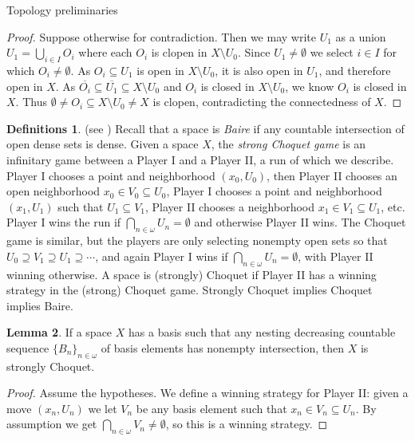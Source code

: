 \documentclass{amsart}
\theoremstyle{definition}\newtheorem{theorem}{Theorem}
\theoremstyle{definition}\newtheorem{bigtheorem}{Theorem}
\numberwithin{theorem}{section}
\theoremstyle{definition}\newtheorem{corollary}[theorem]{Corollary}
\theoremstyle{definition}\newtheorem{proposition}[theorem]{Proposition}
\theoremstyle{definition}\newtheorem{definition}[theorem]{Definition}
\theoremstyle{definition}\newtheorem{question}[theorem]{Question}
\theoremstyle{definition}\newtheorem{example}[theorem]{Example}
\theoremstyle{definition}\newtheorem{remark}[theorem]{Remark}
\theoremstyle{definition}\newtheorem{note}[theorem]{Note}
\theoremstyle{definition}\newtheorem{lemma}[theorem]{Lemma}
\theoremstyle{definition}\newtheorem{fact}[theorem]{Fact}
\theoremstyle{definition}\newtheorem{define}[theorem]{Definition}
\theoremstyle{definition}\newtheorem{definitions}[theorem]{Definitions}
\theoremstyle{definition}\newtheorem{claim}[theorem]{Claim}
\theoremstyle{definition}\newtheorem{obs}[theorem]{Observation}
\theoremstyle{definition}\newtheorem{construction}[theorem]{Construction}
\begin{document}
\begin{section}{Topology preliminaries}
\begin{proof}  Suppose otherwise for contradiction.  Then we may write $U_1$ as a union $U_1 = \bigcup_{i\in I}O_i$ where each $O_i$ is clopen in $X \setminus U_0$.  Since $U_1 \neq \emptyset$ we select $i \in I$ for which $O_i \neq \emptyset$.  As $O_i \subseteq U_1$ is open in $X \setminus U_0$, it is also open in $U_1$, and therefore open in $X$.  As $\overline{O_i} \subseteq \overline{U_1} \subseteq X \setminus U_0$ and $O_i$ is closed in $X \setminus U_0$, we know $O_i$ is closed in $X$.  Thus $\emptyset \neq O_i \subseteq X\setminus U_0 \neq X$ is clopen, contradicting the connectedness of $X$.
\end{proof}

\begin{definitions} (see \cite[Chapter 8]{Ke}) Recall that a space is \emph{Baire} if any countable intersection of open dense sets is dense.  Given a space $X$, the \emph{strong Choquet game} is an infinitary game between a Player I and a Player II, a run of which we describe.  Player I chooses a point and neighborhood $(x_0, U_0)$, then Player II chooses an open neighborhood $x_0 \in V_0 \subseteq U_0$, Player I chooses a point and neighborhood $(x_1, U_1)$ such that $U_1 \subseteq V_1$, Player II chooses a neighborhood $x_1 \in V_1 \subseteq U_1$, etc.  Player I wins the run if $\bigcap_{n\in \omega} U_n = \emptyset$ and otherwise Player II wins.  The Choquet game is similar, but the players are only selecting nonempty open sets so that $U_0 \supseteq V_1 \supseteq U_1 \supseteq \cdots$, and again Player I wins if $\bigcap_{n\in \omega} U_n = \emptyset$, with Player II winning otherwise.  A space is (strongly) Choquet if Player II has a winning strategy in the (strong) Choquet game.  Strongly Choquet implies Choquet implies Baire.
\end{definitions}

\begin{lemma}\label{stronglyChoquetfrombasis}  If a space $X$ has a basis such that any nesting decreasing countable sequence $\{B_n\}_{n\in \omega}$ of basis elements has nonempty intersection, then $X$ is strongly Choquet.
\end{lemma}

\begin{proof}  Assume the hypotheses.  We define a winning strategy for Player II: given a move $(x_n, U_n)$ we let $V_n$ be any basis element such that $x_n \in V_n \subseteq U_n$.  By assumption we get $\bigcap_{n\in \omega} V_n \neq \emptyset$, so this is a winning strategy.
\end{proof}



\end{section}
\end{document}
